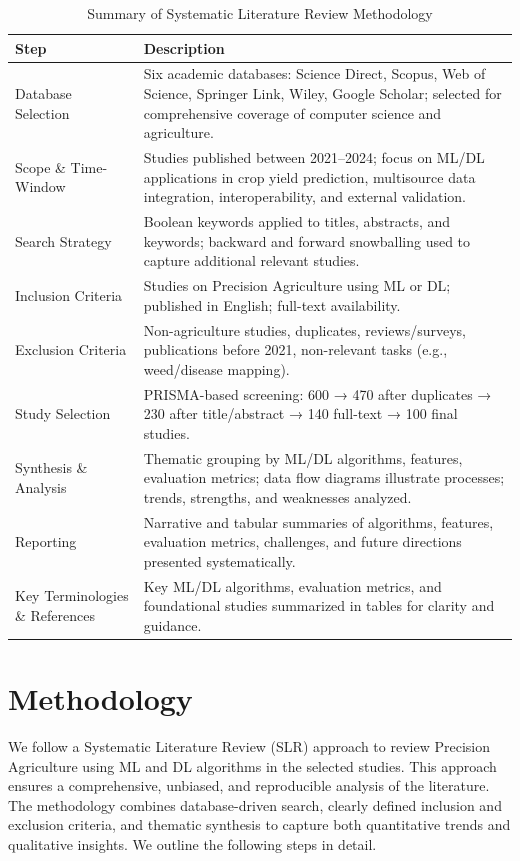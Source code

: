 \documentclass[conference]{IEEEtran}
\begin{document}
\begin{table}[htbp]
\centering
\caption{Summary of Systematic Literature Review Methodology}
\begin{tabular}{|p{3cm}|p{12cm}|}
\hline
\textbf{Step} & \textbf{Description} \\
\hline
Database Selection & Six academic databases: Science Direct, Scopus, Web of Science, Springer Link, Wiley, Google Scholar; selected for comprehensive coverage of computer science and agriculture. \\
\hline
Scope \& Time-Window & Studies published between 2021–2024; focus on ML/DL applications in crop yield prediction, multisource data integration, interoperability, and external validation. \\
\hline
Search Strategy & Boolean keywords applied to titles, abstracts, and keywords; backward and forward snowballing used to capture additional relevant studies. \\
\hline
Inclusion Criteria & Studies on Precision Agriculture using ML or DL; published in English; full-text availability. \\
\hline
Exclusion Criteria & Non-agriculture studies, duplicates, reviews/surveys, publications before 2021, non-relevant tasks (e.g., weed/disease mapping). \\
\hline
Study Selection & PRISMA-based screening: 600 → 470 after duplicates → 230 after title/abstract → 140 full-text → 100 final studies. \\
\hline
Synthesis \& Analysis & Thematic grouping by ML/DL algorithms, features, evaluation metrics; data flow diagrams illustrate processes; trends, strengths, and weaknesses analyzed. \\
\hline
Reporting & Narrative and tabular summaries of algorithms, features, evaluation metrics, challenges, and future directions presented systematically. \\
\hline
Key Terminologies \& References & Key ML/DL algorithms, evaluation metrics, and foundational studies summarized in tables for clarity and guidance. \\
\hline
\end{tabular}
\label{table:methodology_summary}
\end{table}

\section{Methodology}
We follow a Systematic Literature Review (SLR) approach to review Precision Agriculture using ML and DL algorithms in the selected studies. This approach ensures a comprehensive, unbiased, and reproducible analysis of the literature. The methodology combines database-driven search, clearly defined inclusion and exclusion criteria, and thematic synthesis to capture both quantitative trends and qualitative insights. We outline the following steps in detail.
\end{document}
